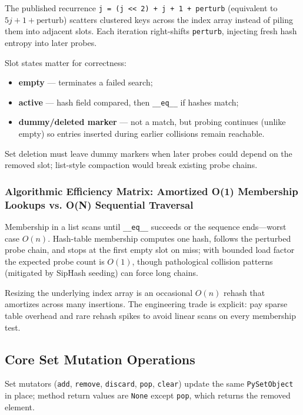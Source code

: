 \documentclass[a4paper,twoside]{report}
\begin{document}
The published recurrence \texttt{j = (j << 2) + j + 1 + perturb} (equivalent to $5j + 1 + \text{perturb}$) scatters clustered keys across the index array instead of piling them into adjacent slots. Each iteration right-shifts \texttt{perturb}, injecting fresh hash entropy into later probes.

Slot states matter for correctness:

\begin{itemize}
    \item \textbf{empty} --- terminates a failed search;
    \item \textbf{active} --- hash field compared, then \texttt{\_\_eq\_\_} if hashes match;
    \item \textbf{dummy/deleted marker} --- not a match, but probing continues (unlike empty) so entries inserted during earlier collisions remain reachable.
\end{itemize}

Set deletion must leave dummy markers when later probes could depend on the removed slot; list-style compaction would break existing probe chains.

\subsubsection{Algorithmic Efficiency Matrix: Amortized O(1) Membership Lookups vs. O(N) Sequential Traversal}

Membership in a list scans until \texttt{\_\_eq\_\_} succeeds or the sequence ends---worst case $O(n)$. Hash-table membership computes one hash, follows the perturbed probe chain, and stops at the first empty slot on miss; with bounded load factor the expected probe count is $O(1)$, though pathological collision patterns (mitigated by SipHash seeding) can force long chains.

Resizing the underlying index array is an occasional $O(n)$ rehash that amortizes across many insertions. The engineering trade is explicit: pay sparse table overhead and rare rehash spikes to avoid linear scans on every membership test.


\subsection{Core Set Mutation Operations}

Set mutators (\texttt{add}, \texttt{remove}, \texttt{discard}, \texttt{pop}, \texttt{clear}) update the same \texttt{PySetObject} in place; method return values are \texttt{None} except \texttt{pop}, which returns the removed element.
\end{document}
